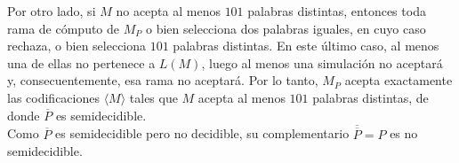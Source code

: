 \begin{ejercicio}
    Por otro lado, si $M$ no acepta al menos $101$ palabras distintas, entonces 
    toda rama de cómputo de $M_P$ o bien selecciona dos palabras iguales, en cuyo 
    caso rechaza, o bien selecciona $101$ palabras distintas. En este último caso, 
    al menos una de ellas no pertenece a $L(M)$, luego al menos una simulación no 
    aceptará y, consecuentemente, esa rama no aceptará. Por lo tanto, $M_P$ acepta 
    exactamente las codificaciones $\langle M\rangle$ tales que $M$ acepta al menos 
    $101$ palabras distintas, de donde $\overline{P}$ es semidecidible. \\

    Como $\overline{P}$ es semidecidible pero no decidible, su complementario $\overline{\overline{P}} = P$ es 
    no semidecidible.
\end{ejercicio}




